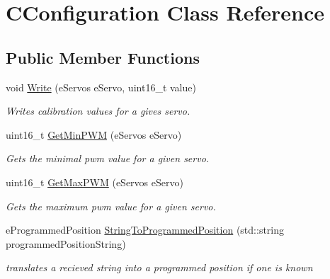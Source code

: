 \hypertarget{classCConfiguration}{}\section{C\+Configuration Class Reference}
\label{classCConfiguration}
\subsection*{Public Member Functions}
\begin{DoxyCompactItemize}
\item 
void \hyperlink{classCConfiguration_a3d19b67de92d6035f6d99e61828bb895}{Write} (e\+Servos e\+Servo, uint16\+\_\+t value)
\begin{DoxyCompactList}\small\item\em Writes calibration values for a gives servo. \end{DoxyCompactList}\item 
uint16\+\_\+t \hyperlink{classCConfiguration_a8c403f01f00fa41c5cfa1b7b7fc54643}{Get\+Min\+P\+WM} (e\+Servos e\+Servo)
\begin{DoxyCompactList}\small\item\em Gets the minimal pwm value for a given servo. \end{DoxyCompactList}\item 
uint16\+\_\+t \hyperlink{classCConfiguration_a802c3702798ee1dd456d663530da89d0}{Get\+Max\+P\+WM} (e\+Servos e\+Servo)
\begin{DoxyCompactList}\small\item\em Gets the maximum pwm value for a given servo. \end{DoxyCompactList}\item 
e\+Programmed\+Position \hyperlink{classCConfiguration_aeaa35322a42eb0fb16f04d43f98ee9af}{String\+To\+Programmed\+Position} (std\+::string programmed\+Position\+String)
\begin{DoxyCompactList}\small\item\em translates a recieved string into a programmed position if one is known \end{DoxyCompactList}\end{DoxyCompactItemize}
